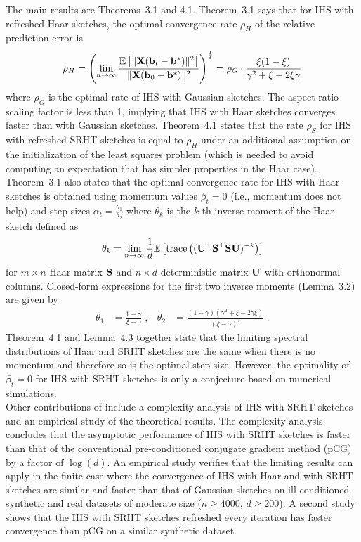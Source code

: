 The main results are Theorems~3.1 and 4.1. Theorem~3.1 says that for IHS with refreshed Haar sketches, the optimal convergence rate $\rho_H$ of the relative prediction error is
\[
\rho_H  = \left(\lim_{n\rightarrow\infty}\frac{\mathbb{E}\left[\|\mathbf{X}(\mathbf{b}_t-\mathbf{b}^*)\|^2\right]}{\|\mathbf{X}(\mathbf{b}_0-\mathbf{b}^*)\|^2}\right)^\frac{1}{t} = \rho_G\cdot\frac{\xi(1-\xi)}{\gamma^2+\xi-2\xi\gamma}
\]
where $\rho_G$ is the optimal rate of IHS with Gaussian sketches. The aspect ratio scaling factor is less than 1, implying that IHS with Haar sketches converges faster than with Gaussian sketches.  Theorem~4.1 states that the rate $\rho_S$ for IHS with refreshed SRHT sketches is equal to $\rho_H$ under an additional assumption on the initialization of the least squares problem (which is needed to avoid computing an expectation that has simpler properties in the Haar case). Theorem~3.1 also states that the optimal convergence rate for IHS with Haar sketches is obtained using momentum values $\beta_t=0$ (i.e., momentum does not help) and step sizes $\alpha_t = \frac{\theta_1}{\theta_2}$ where $\theta_k$ is the $k$-th inverse moment of the Haar sketch defined as
\[
\theta_k = \lim_{n\rightarrow\infty}\frac{1}{d}\mathbb{E}\left[\mathrm{trace}\left((\mathbf{U}^\top\mathbf{S}^\top\mathbf{S}\mathbf{U})^{-k}\right)\right]
\]
for $m\times n$ Haar matrix $\mathbf{S}$ and $n\times d$ deterministic matrix $\mathbf{U}$ with orthonormal columns. Closed-form expressions for the first two inverse moments (Lemma~3.2) are given by
\begin{align*}
\theta_1 &= \frac{1-\gamma}{\xi-\gamma} \;, & \theta_2 &= \frac{(1-\gamma)(\gamma^2+\xi-2\gamma\xi)}{(\xi-\gamma)^3} \;.
\end{align*}
Theorem~4.1 and Lemma~4.3 together state that the limiting spectral distributions of Haar and SRHT sketches are the same when there is no momentum and therefore so is the optimal step size. However, the optimality of $\beta_t=0$ for IHS with SRHT sketches is only a conjecture based on numerical simulations.
\\

Other contributions of \citet{Lacotte:2020} include a complexity analysis of IHS with SRHT sketches and an empirical study of the theoretical results. The complexity analysis concludes that the asymptotic performance of IHS with SRHT sketches is faster than that of the conventional pre-conditioned conjugate gradient method (pCG) \citep{Rokhlin:2008} by a factor of $\log(d)$. An empirical study verifies that the limiting results can apply in the finite case where the convergence of IHS with Haar and with SRHT sketches are similar and faster than that of Gaussian sketches on ill-conditioned synthetic and real datasets of moderate size ($n\geq 4000$, $d\geq 200$). A second study shows that the IHS with SRHT sketches refreshed every iteration has faster convergence than pCG on a similar synthetic dataset.


